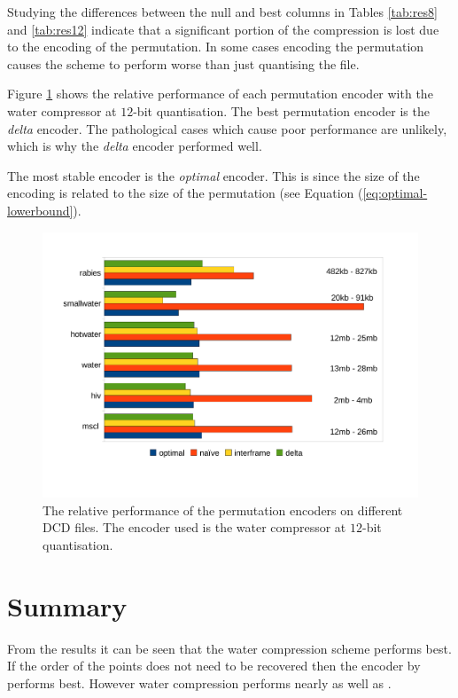 \documentclass[a4paper]{report}
\begin{document}
Studying the differences between the null and best columns in Tables
\ref{tab:res8} and \ref{tab:res12} indicate that a significant portion of the
compression is lost due to the encoding of the permutation. In some cases
encoding the permutation causes the scheme to perform worse than just
quantising the file.

Figure \ref{fig:perm} shows the relative performance of each permutation
encoder with the water compressor at $12$-bit quantisation. The best
permutation encoder is the \emph{delta} encoder. The pathological cases which
cause poor performance are unlikely, which is why the \emph{delta} encoder
performed well.

The most stable encoder is the \emph{optimal} encoder. This is since the size
of the encoding is related to the size of the permutation (see Equation
(\ref{eq:optimal-lowerbound}).

\begin{figure}[h]
\centering
\includegraphics{images/perm}
\caption{The relative performance of the permutation encoders on different DCD
  files. The encoder used is the water compressor at $12$-bit quantisation.}
\label{fig:perm}
\end{figure}


\section{Summary}
\label{sec:summary}

From the results it can be seen that the water compression scheme performs
best. If the order of the points does not need to be recovered then the
encoder by \citep{gumholdcomp} performs best. However water compression
performs nearly as well as \citep{gumholdcomp}.
\end{document}
